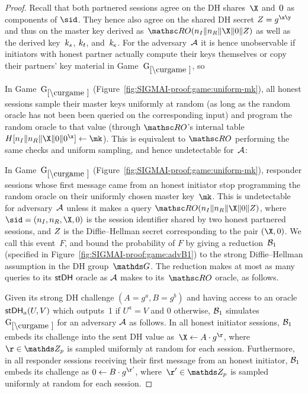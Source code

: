 \begin{proof}
Recall that both partnered sessions agree on the DH shares~$\X$ and~$\Y$ as components of $\sid$.
They hence also agree on the shared DH secret $Z = g^{\x\y}$ and thus on the master key derived as~$\RO(\nonce_I \conc \nonce_R \conc \X \conc \Y \conc Z)$ as well as the derived key~$k_s$, $k_t$, and~$k_e$.
For the adversary~$\mathcal{A}$ it is hence unobservable if initiators with honest partner actually compute their keys themselves or copy their partners' key material in Game~$\curGm$, so

\iffull %
\SIGMIProofRecordKeysInitiatorsCopy
\fi


\proofngame[uniform-mk]

In Game~$\curGm$ (Figure~\ref{fig:SIGMAI-proof:game:uniform-mk}),
all honest sessions sample their master keys uniformly at random (as long as the random oracle has not been been queried on the corresponding input) and program the random oracle to that value (through $\RO$'s internal table~$H[\nonce_I\|\nonce_R\|\X\|\Y\|\Y^{\x}] \gets \mk$).
This is equivalent to $\RO$ performing the same checks and uniform sampling, and hence undetectable for~$\mathcal{A}$:



In Game~$\curGm$ (Figure~\ref{fig:SIGMAI-proof:game:uniform-mk}), responder sessions whose first message came from an honest initiator stop programming the random oracle on their uniformly chosen master key~$\mk$.
This is undetectable for adversary~$\mathcal{A}$ unless it makes a query $\RO(\nonce_I\|\nonce_R\|\X\|\Y\|\Zz)$,
where $\sid = (\nonce_I,\nonce_R,\X,\Y)$ is the session identifier shared by two honest partnered sessions, and $Z$ is the Diffie--Hellman secret corresponding to the pair $(\X,\Y)$.
We call this event~$F$, and bound the probability of $F$ by giving a reduction~$\mathcal{B}_1$ (specified in Figure~\ref{fig:SIGMAI-proof:game:advB1}) to the strong Diffie--Hellman assumption in the DH group~$\group$. The reduction makes at most as many queries to its $\mathsf{stDH}$ oracle as $\mathcal{A}$ makes to its~$\RO$ oracle, as follows.

Given its strong DH challenge $(A = g^a, B = g^b)$ and having access to an oracle~$\mathsf{stDH}_a(U, V)$ which outputs~1 if $U^a = V$ and 0 otherwise,
$\mathcal{B}_1$ simulates $\curGm$ for an adversary $\mathcal{A}$ as follows.
In all honest initiator sessions, $\mathcal{B}_1$ embeds its challenge into the sent DH value as~$\X \gets A \cdot g^\r$, where~$\r \in \ZZ_p$ is sampled uniformly at random for each session.
Furthermore, in all responder sessions receiving their first message from an honest initiator, $\mathcal{B}_1$ embeds its challenge as $\Y \gets B \cdot g^{\r'}$, where~$\r' \in \ZZ_p$ is sampled uniformly at random for each session.


\end{proof}
